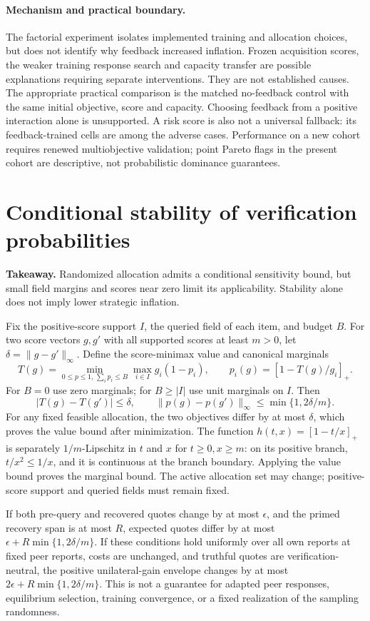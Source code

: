 \documentclass[11pt]{article}
\begin{document}
\paragraph{Mechanism and practical boundary.}
The factorial experiment isolates implemented training and allocation choices,
but does not identify why feedback increased inflation. Frozen acquisition
scores, the weaker training response search and capacity transfer are possible
explanations requiring separate interventions. They are not established causes.
The appropriate practical comparison is the matched no-feedback control with
the same initial objective, score and capacity. Choosing feedback from a
positive interaction alone is unsupported. A risk score is also not a universal
fallback: its feedback-trained cells are among the adverse cases. Performance
on a new cohort requires renewed multiobjective validation; point Pareto flags
in the present cohort are descriptive, not probabilistic dominance guarantees.

\section{Conditional stability of verification probabilities}
\noindent\textbf{Takeaway.} Randomized allocation admits a conditional
sensitivity bound, but small field margins and scores near zero limit its
applicability. Stability alone does not imply lower strategic inflation.

Fix the positive-score support $I$, the queried field of each item, and budget
$B$. For two score vectors $g,g'$ with all supported scores at least $m>0$, let
$\delta=\|g-g'\|_\infty$. Define the score-minimax value and canonical marginals
\[
 T(g)=\min_{0\leq p\leq1,\,\sum_i p_i\leq B}\max_{i\in I}g_i(1-p_i),
 \qquad p_i(g)=[1-T(g)/g_i]_+.
\]
For $B=0$ use zero marginals; for $B\geq |I|$ use unit marginals on $I$.
Then
\[
 |T(g)-T(g')|\leq\delta,\qquad
 \|p(g)-p(g')\|_\infty\leq\min\{1,2\delta/m\}.
\]
For any fixed feasible allocation, the two objectives differ by at most
$\delta$, which proves the value bound after minimization. The function
$h(t,x)=[1-t/x]_+$ is separately $1/m$-Lipschitz in $t$ and $x$ for
$t\geq0,x\geq m$: on its positive branch, $t/x^2\leq1/x$, and it is
continuous at the branch boundary. Applying the value bound proves the
marginal bound. The active allocation set may change; positive-score support
and queried fields must remain fixed.

If both pre-query and recovered quotes change by at most $\epsilon$, and the
primed recovery span is at most $R$, expected quotes differ by at most
$\epsilon+R\min\{1,2\delta/m\}$. If these conditions hold uniformly over
all own reports at fixed peer reports, costs are unchanged, and truthful
quotes are verification-neutral, the positive unilateral-gain envelope changes
by at most $2\epsilon+R\min\{1,2\delta/m\}$. This is not a guarantee for
adapted peer responses, equilibrium selection, training convergence, or a
fixed realization of the sampling randomness.
\end{document}
